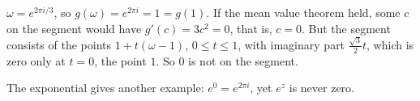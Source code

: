 \begin{solution}
  $\omega = e^{2\pi i/3}$, so $g(\omega) = e^{2\pi i} = 1 = g(1)$. If the mean
  value theorem held, some $c$ on the segment would have
  $g'(c) = 3c^2 = 0$, that is, $c = 0$. But the segment consists of the points
  $1 + t(\omega - 1)$, $0 \leq t \leq 1$, with imaginary part
  $\frac{\sqrt3}{2} t$, which is zero only at $t = 0$, the point $1$. So $0$
  is not on the segment.
\end{solution}

\begin{remark}
  The exponential gives another example: $e^0 = e^{2\pi i}$, yet $e^z$ is
  never zero.
\end{remark}
